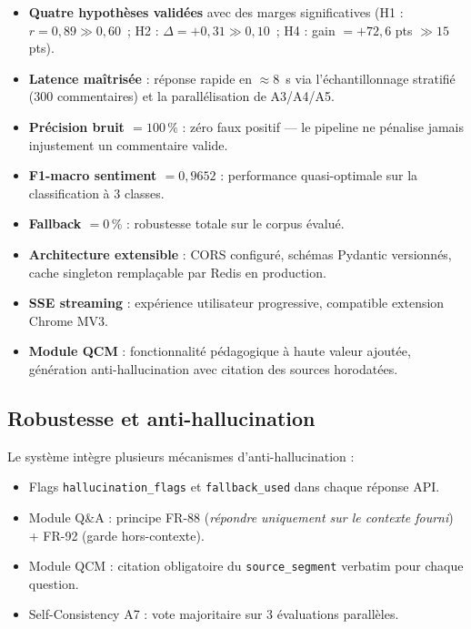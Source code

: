 \documentclass[12pt, a4paper]{article}
\begin{document}
\begin{itemize}
  \item \textbf{Quatre hypothèses validées} avec des marges significatives
        (H1 : $r = 0{,}89 \gg 0{,}60$~; H2 : $\Delta = +0{,}31 \gg 0{,}10$~;
         H4 : gain $= +72{,}6$ pts $\gg 15$ pts).
  \item \textbf{Latence maîtrisée} : réponse rapide en $\approx$8~s via
        l'échantillonnage stratifié (300 commentaires) et la parallélisation
        de A3/A4/A5.
  \item \textbf{Précision bruit $= 100\,\%$} : zéro faux positif --- le
        pipeline ne pénalise jamais injustement un commentaire valide.
  \item \textbf{F1-macro sentiment $= 0{,}9652$} : performance quasi-optimale
        sur la classification à 3 classes.
  \item \textbf{Fallback $= 0\,\%$} : robustesse totale sur le corpus évalué.
  \item \textbf{Architecture extensible} : CORS configuré, schémas Pydantic
        versionnés, cache singleton remplaçable par Redis en production.
  \item \textbf{SSE streaming} : expérience utilisateur progressive, compatible
        extension Chrome MV3.
  \item \textbf{Module QCM} : fonctionnalité pédagogique à haute valeur ajoutée,
        génération anti-hallucination avec citation des sources horodatées.
\end{itemize}

\subsection{Robustesse et anti-hallucination}

Le système intègre plusieurs mécanismes d'anti-hallucination :

\begin{itemize}
  \item Flags \texttt{hallucination\_flags} et \texttt{fallback\_used} dans
        chaque réponse API.
  \item Module Q\&A : principe FR-88 (\textit{répondre uniquement sur le contexte
        fourni}) + FR-92 (garde hors-contexte).
  \item Module QCM : citation obligatoire du \texttt{source\_segment} verbatim
        pour chaque question.
  \item Self-Consistency A7 : vote majoritaire sur 3 évaluations parallèles.
\end{itemize}
\end{document}

